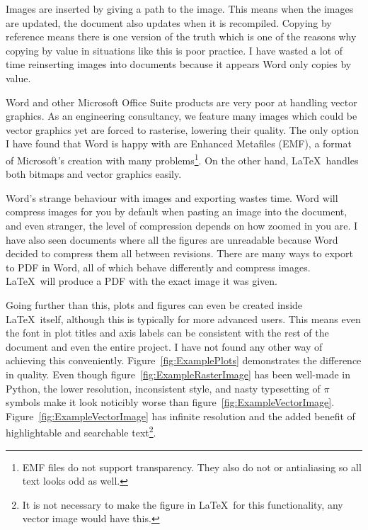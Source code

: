 Images are inserted by giving a path to the image. This means when the images are updated, the document also updates when it is recompiled. Copying by reference means there is one version of the truth which is one of the reasons why copying by value in situations like this is poor practice. I have wasted a lot of time reinserting images into documents because it appears Word only copies by value.

Word and other Microsoft Office Suite products are very poor at handling vector graphics. As an engineering consultancy, we feature many images which could be vector graphics yet are forced to rasterise, lowering their quality. The only option I have found that Word is happy with are Enhanced Metafiles (EMF), a format of Microsoft's creation with many problems\footnote{EMF files do not support transparency. They also do not or antialiasing so all text looks odd as well.}. On the other hand, \LaTeX\ handles both bitmaps and vector graphics easily.

Word's strange behaviour with images and exporting wastes time. Word will compress images for you by default when pasting an image into the document, and even stranger, the level of compression depends on how zoomed in you are. I have also seen documents where all the figures are unreadable because Word decided to compress them all between revisions. There are many ways to export to PDF in Word, all of which behave differently and compress images. \LaTeX\ will produce a PDF with the exact image it was given.

Going further than this, plots and figures can even be created inside \LaTeX\ itself, although this is typically for more advanced users. This means even the font in plot titles and axis labels can be consistent with the rest of the document and even the entire project. I have not found any other way of achieving this conveniently. Figure~\ref{fig:ExamplePlots} demonstrates the difference in quality. Even though figure~\ref{fig:ExampleRasterImage} has been well-made in Python, the lower resolution, inconsistent style, and nasty typesetting of $\pi$ symbols make it look noticibly worse than figure~\ref{fig:ExampleVectorImage}. Figure~\ref{fig:ExampleVectorImage} has infinite resolution and the added benefit of highlightable and searchable text\footnote{It is not necessary to make the figure in \LaTeX\ for this functionality, any vector image would have this.}.


